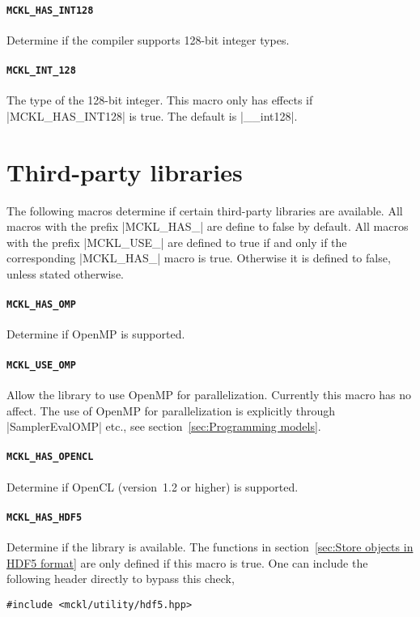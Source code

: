 \paragraph{\texttt{MCKL\_HAS\_INT128}} Determine if the compiler supports
128-bit integer types.

\paragraph{\texttt{MCKL\_INT\_128}} The type of the 128-bit integer. This macro
only has effects if |MCKL_HAS_INT128| is true. The default is |__int128|.

\section{Third-party libraries}
\label{sec:Third-party libraries}

The following macros determine if certain third-party libraries are available.
All macros with the prefix |MCKL_HAS_| are define to false by default. All
macros with the prefix |MCKL_USE_| are defined to true if and only if the
corresponding |MCKL_HAS_| macro is true. Otherwise it is defined to false,
unless stated otherwise.

\paragraph{\texttt{MCKL\_HAS\_OMP}} Determine if OpenMP is supported.

\paragraph{\texttt{MCKL\_USE\_OMP}} Allow the library to use OpenMP for
parallelization. Currently this macro has no affect. The use of OpenMP for
parallelization is explicitly through |SamplerEvalOMP| etc., see
section~\ref{sec:Programming models}.

\paragraph{\texttt{MCKL\_HAS\_OPENCL}} Determine if OpenCL (version~1.2 or
higher) is supported.

\paragraph{\texttt{MCKL\_HAS\_HDF5}} Determine if the \hdf library is
available. The functions in section~\ref{sec:Store objects in HDF5 format} are
only defined if this macro is true. One can include the following header
directly to bypass this check,
\begin{verbatim}
#include <mckl/utility/hdf5.hpp>
\end{verbatim}

